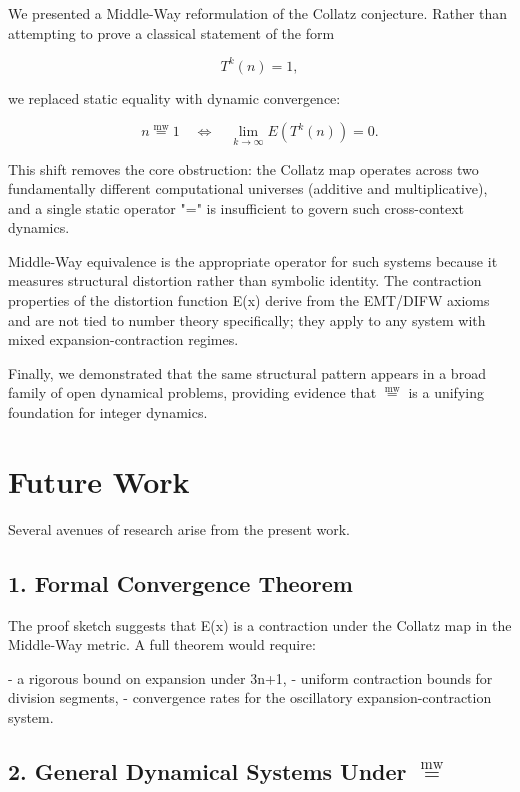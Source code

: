 \documentclass[11pt]{article}
\newcommand{\mweq}{\mathrel{\overset{\mathrm{mw}}{=}}}
\theoremstyle{definition}
\theoremstyle{remark}
\begin{document}
We presented a Middle-Way reformulation of the Collatz conjecture.
Rather than attempting to prove a classical statement of the form

\[
  T^{k}(n) = 1,
\]

we replaced static equality with dynamic convergence:

\[
  n \mweq 1 \quad \Longleftrightarrow \quad
  \lim_{k \to \infty} E(T^{k}(n)) = 0.
\]

This shift removes the core obstruction: the Collatz map operates across
two fundamentally different computational universes (additive and
multiplicative), and a single static operator "=" is insufficient to
govern such cross-context dynamics.

Middle-Way equivalence is the appropriate operator for such systems
because it measures structural distortion rather than symbolic identity.
The contraction properties of the distortion function E(x) derive from
the EMT/DIFW axioms and are not tied to number theory specifically;
they apply to any system with mixed expansion-contraction regimes.

Finally, we demonstrated that the same structural pattern appears in a
broad family of open dynamical problems, providing evidence that $\mweq$ is
a unifying foundation for integer dynamics.

\section{Future Work}

Several avenues of research arise from the present work.

\subsection{1. Formal Convergence Theorem}

The proof sketch suggests that E(x) is a contraction under the Collatz
map in the Middle-Way metric.  
A full theorem would require:

- a rigorous bound on expansion under 3n+1,
- uniform contraction bounds for division segments,
- convergence rates for the oscillatory expansion-contraction system.

\subsection{2. General Dynamical Systems Under $\mweq$}
\end{document}
